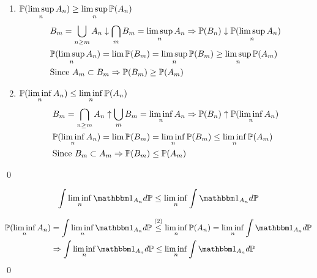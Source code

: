 \begin{enumerate}
    \item $\mathbb{P}(\limsup\limits_{n} A_n) \geq \limsup\limits_{n} \mathbb{P}(A_n)$
    \begin{align*}
    &B_m = \bigcup\limits_{n\geq m}A_n \downarrow \bigcap\limits_{m}B_m = \limsup\limits_{n}A_n \Rightarrow \mathbb{P}(B_n) \downarrow \mathbb{P}(\limsup\limits_{n}A_n)\\
    &\mathbb{P}(\limsup\limits_{n}A_n) = \lim \mathbb{P}(B_m) = \limsup\limits_{n}\mathbb{P}(B_m) \geq\limsup\limits_{n}\mathbb{P}(A_m) \\
    &\text{Since } A_m \subset B_m \Rightarrow \mathbb{P}(B_m) \geq \mathbb{P}(A_m)
    \end{align*}
    \item $\mathbb{P}(\liminf\limits_{n} A_n) \leq \liminf\limits_{n} \mathbb{P}(A_n)$
    \begin{align*}
        &B_m = \bigcap\limits_{n\geq m}A_n \uparrow \bigcup\limits_{m}B_m = \liminf\limits_{n}A_n \Rightarrow \mathbb{P}(B_n) \uparrow \mathbb{P}(\liminf\limits_{n}A_n)\\
    &\mathbb{P}(\liminf\limits_{n}A_n) = \lim \mathbb{P}(B_m) = \liminf\limits_{n}\mathbb{P}(B_m) \leq\liminf\limits_{n}\mathbb{P}(A_m) \\
    &\text{Since } B_m \subset A_m \Rightarrow \mathbb{P}(B_m) \leq \mathbb{P}(A_m)
    \end{align*}
\end{enumerate}
\qed
\begin{lem}
\begin{equation*}
    \int \linf{n} \I_{A_n} d\prob \leq \linf{n}\int \I_{A_n} d\prob
\end{equation*}
\end{lem}
\pf \begin{align*}
    \prob(\linf{n} A_n) &=\int \linf{n} \I_{A_n} d\prob \stackrel{(2)}{\leq} \linf{n}\prob(A_n) = \linf{n}\int \I_{A_n} d\prob \\
    &\Rightarrow \int \linf{n} \I_{A_n} d\prob \leq \linf{n}\int \I_{A_n} d\prob
\end{align*}
\qed
\newpage
